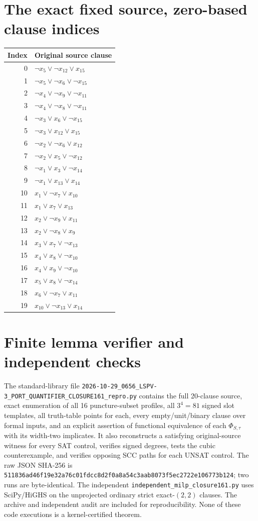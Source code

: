\documentclass[11pt]{article}
\begin{document}
\section{The exact fixed source, zero-based clause indices}\label{app:source}
\small
\begin{longtable}{r l}
\toprule Index & Original source clause\\\midrule\endhead
0 & $\neg x_5\vee\neg x_{12}\vee x_{15}$\\
1 & $\neg x_5\vee\neg x_6\vee\neg x_{15}$\\
2 & $\neg x_4\vee\neg x_9\vee\neg x_{11}$\\
3 & $\neg x_4\vee\neg x_8\vee\neg x_{11}$\\
4 & $\neg x_3\vee x_6\vee\neg x_{15}$\\
5 & $\neg x_3\vee x_{12}\vee x_{15}$\\
6 & $\neg x_2\vee\neg x_6\vee x_{12}$\\
7 & $\neg x_2\vee x_5\vee\neg x_{12}$\\
8 & $\neg x_1\vee x_3\vee\neg x_{14}$\\
9 & $\neg x_1\vee x_{13}\vee x_{14}$\\
10 & $x_1\vee\neg x_7\vee x_{10}$\\
11 & $x_1\vee x_7\vee x_{13}$\\
12 & $x_2\vee\neg x_9\vee x_{11}$\\
13 & $x_2\vee\neg x_8\vee x_9$\\
14 & $x_3\vee x_7\vee\neg x_{13}$\\
15 & $x_4\vee x_8\vee\neg x_{10}$\\
16 & $x_4\vee x_9\vee\neg x_{10}$\\
17 & $x_5\vee x_8\vee\neg x_{14}$\\
18 & $x_6\vee\neg x_7\vee x_{11}$\\
19 & $x_{10}\vee\neg x_{13}\vee x_{14}$\\
\bottomrule
\end{longtable}
\normalsize
\section{Finite lemma verifier and independent checks}\label{app:verification}
The standard-library file \texttt{2026-10-29\_0656\_LSPV-3\_PORT\_QUANTIFIER\_CLOSURE161\_repro.py} contains the full 20-clause source, exact enumeration of all 16 puncture-subset profiles, all $3^4=81$ signed slot templates, all truth-table points for each, every empty/unit/binary clause over formal inputs, and an explicit assertion of functional equivalence of each $\Phi_{S,\tau}$ with its width-two implicates. It also reconstructs a satisfying original-source witness for every SAT control, verifies signed degrees, tests the cubic counterexample, and verifies opposing SCC paths for each UNSAT control. The raw JSON SHA-256 is \texttt{511836ad46f19e32a76c01fdcc8d2f0a8a54c3aab8073f5ec2722e106773b124}; two runs are byte-identical. The independent \texttt{independent\_milp\_closure161.py} uses SciPy/HiGHS on the unprojected ordinary strict exact-$(2,2)$ clauses. The archive and independent audit are included for reproducibility. None of these code executions is a kernel-certified theorem.
\end{document}
